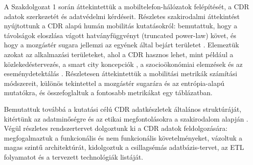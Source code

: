 A Szakdolgozat 1 során áttekintettük a mobiltelefon-hálózatok felépítését, a CDR
adatok szerkezetét és adatvédelmi kérdéseit. Részletes szakirodalmi áttekintést
nyújtottunk a CDR alapú humán mobilitás kutatásokról: bemutattuk, hogy a
távolságok eloszlása vágott hatványfüggvényt (truncated power-law) követ, és hogy
a mozgástér sugara jellemzi az egyének által bejárt területet \cite{gonzalez2008understanding}.
Elemeztük azokat az alkalmazási területeket, ahol a CDR hasznos lehet, mint
például a közlekedéstervezés, a smart city koncepciók \cite{batty2012smart}, a
szocioökonómiai elemzések \cite{pinter2021evaluating, rhoads2020measuring} és az
eseménydetektálás \cite{traag2011social}. Részletesen áttekintettük a mobilitási
metrikák számítási módszereit, különös tekintettel a mozgástér sugarára és az
entrópia-alapú mutatókra, és összefoglaltuk a fontosabb metrikákat egy táblázatban.

Bemutattuk továbbá a kutatási célú CDR adatkészletek általános struktúráját,
kitértünk az adatminőségre és az etikai megfontolásokra a szakirodalom alapján
\cite{pinter2022awakening, zhang2019connected}. Végül részletes rendszertervet dolgoztunk
ki a CDR adatok feldolgozására: megfogalmaztuk a funkcionális és nem
funkcionális követelményeket, vázoltuk a magas szintű architektúrát, kidolgoztuk
a csillagsémás adatbázis-tervet, az ETL folyamatot és a tervezett technológiák listáját.

